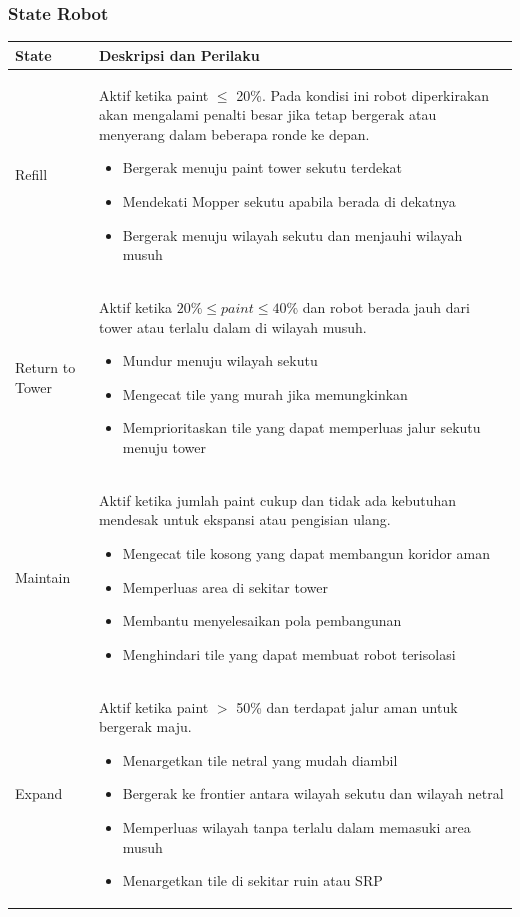 \documentclass{article}
\renewcommand{\arraystretch}{1.3}
\begin{document}
\subsubsection{State Robot}

\begin{table}[H]
\centering
\renewcommand{\arraystretch}{1.2}
\begin{tabular}{|p{3cm}|p{11cm}|}
\hline
\textbf{State} & \textbf{Deskripsi dan Perilaku} \\
\hline

Refill &
Aktif ketika paint $\leq$ 20\%. Pada kondisi ini robot diperkirakan akan mengalami penalti besar jika tetap bergerak atau menyerang dalam beberapa ronde ke depan.
\begin{itemize}[leftmargin=*, nosep]
\item Bergerak menuju paint tower sekutu terdekat
\item Mendekati Mopper sekutu apabila berada di dekatnya
\item Bergerak menuju wilayah sekutu dan menjauhi wilayah musuh
\end{itemize}
\\
\hline

Return to Tower &
Aktif ketika $20\% \leq paint \leq 40\%$ dan robot berada jauh dari tower atau terlalu dalam di wilayah musuh.
\begin{itemize}[leftmargin=*, nosep]
\item Mundur menuju wilayah sekutu
\item Mengecat tile yang murah jika memungkinkan
\item Memprioritaskan tile yang dapat memperluas jalur sekutu menuju tower
\end{itemize}
\\
\hline

Maintain &
Aktif ketika jumlah paint cukup dan tidak ada kebutuhan mendesak untuk ekspansi atau pengisian ulang.
\begin{itemize}[leftmargin=*, nosep]
\item Mengecat tile kosong yang dapat membangun koridor aman
\item Memperluas area di sekitar tower
\item Membantu menyelesaikan pola pembangunan
\item Menghindari tile yang dapat membuat robot terisolasi
\end{itemize}
\\
\hline

Expand &
Aktif ketika paint $>$ 50\% dan terdapat jalur aman untuk bergerak maju.
\begin{itemize}[leftmargin=*, nosep]
\item Menargetkan tile netral yang mudah diambil
\item Bergerak ke frontier antara wilayah sekutu dan wilayah netral
\item Memperluas wilayah tanpa terlalu dalam memasuki area musuh
\item Menargetkan tile di sekitar ruin atau SRP
\end{itemize}
\\
\hline


\end{tabular}
\end{table}
\end{document}
